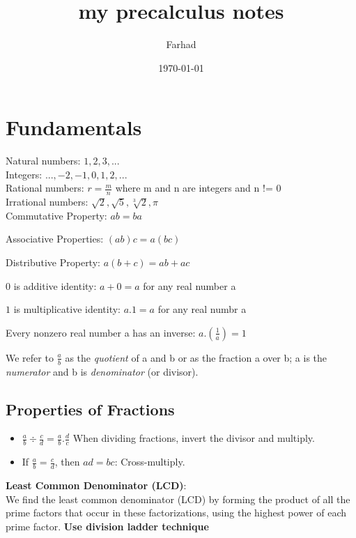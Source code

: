 \documentclass{article}
\author{Farhad}
\title{my precalculus notes}
\date{\today}
\begin{document}
\maketitle

\section*{Fundamentals}

Natural numbers: $ 1, 2, 3, ... $ \\
Integers: $..., -2, -1, 0, 1, 2, ...$ \\
Rational numbers: $ r = \frac{m}{n} $ where m and n are integers and n != 0 \\
Irrational numbers: $ \sqrt{2}, \sqrt{5}, \sqrt[3]{2}, \pi  $ \\
\newline
Commutative Property: $ ab = ba $

Associative Properties: $ (ab)c = a(bc) $

Distributive Property: $ a(b + c) = ab + ac $

$0$ is additive identity: $ a + 0 = a $ for any real number a

$1$ is multiplicative identity: $ a . 1 = a $ for any real numbr a

Every nonzero real number a has an inverse: $ a . (\frac{1}{a}) = 1 $

We refer to $\frac{a}{b}$ as the \emph{quotient} of a and b or as the fraction a over b; a is the \emph{numerator} and b is \emph{denominator} (or divisor).

\subsection*{Properties of Fractions}
\begin{itemize}
\item $ \frac{a}{b} \div \frac{c}{d} = \frac{a}{b} . \frac{d}{c} $ When dividing fractions, invert the divisor and multiply.
\item If $ \frac{a}{b} = \frac{c}{d} $, then $ ad = bc $: Cross-multiply.
\end{itemize}

\textbf{Least Common Denominator (LCD)}: \\
We find the least common denominator (LCD) by forming the product of
all the prime factors that occur in these factorizations, using the
highest power of each prime factor. \textbf{Use division ladder technique}
\end{document}
